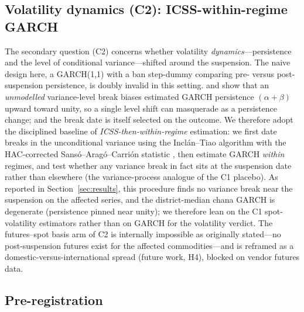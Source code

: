 \subsection{Volatility dynamics (C2): ICSS-within-regime GARCH}
\label{ssec:garch}

The secondary question (C2) concerns whether volatility \emph{dynamics}---persistence and
the level of conditional variance---shifted around the suspension. The naive design here, a
GARCH(1,1) with a ban step-dummy comparing pre- versus post-suspension persistence, is doubly
invalid in this setting. \citet{Hillebrand} and \citet{Lamoureux1990} show that an
\emph{unmodelled} variance-level break biases estimated GARCH persistence $(\alpha+\beta)$
upward toward unity, so a single level shift can masquerade as a persistence change; and the
break date is itself selected on the outcome. We therefore adopt the disciplined baseline of
\emph{ICSS-then-within-regime} estimation: we first date breaks in the unconditional variance
using the Inclán--Tiao algorithm with the HAC-corrected Sansó--Aragó--Carrión statistic
\citep{InclanTiao, Sanso}, then estimate GARCH \emph{within} regimes, and test whether any
variance break in fact sits at the suspension date rather than elsewhere (the variance-process
analogue of the C1 placebo). As reported in Section~\ref{sec:results}, this procedure finds no
variance break near the suspension on the affected series, and the district-median chana GARCH
is degenerate (persistence pinned near unity); we therefore lean on the C1 spot-volatility
estimators rather than on GARCH for the volatility verdict. The futures--spot basis arm of C2
is internally impossible as originally stated---no post-suspension futures exist for the affected
commodities---and is reframed as a domestic-versus-international spread (future work, H4), blocked
on vendor futures data.

\subsection{Pre-registration}

